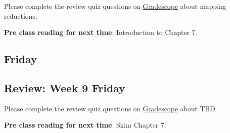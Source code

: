 Please complete the review quiz questions on \href{http://gradescope.com}{Gradescope} about 
mapping reductions.

{\bf Pre class reading for next time}: Introduction to Chapter 7.



\newpage
\subsection*{Friday}



\newpage
\subsection*{Review: Week 9 Friday}


Please complete the review quiz questions on \href{http://gradescope.com}{Gradescope} about 
TBD

{\bf Pre class reading for next time}: Skim Chapter 7.

\newpage
